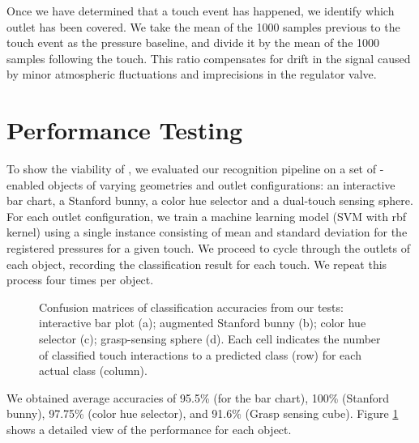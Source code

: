 			Once we have determined that a touch event has happened, we identify which
			outlet has been covered. We take the mean of the 1000 samples previous to
			the touch event as the pressure baseline, and divide it by the mean of the
			1000 samples following the touch. This ratio compensates for drift in the
			signal caused by minor atmospheric fluctuations and imprecisions in the
			regulator valve.

    \section{Performance Testing}
			To show the viability of \at, we evaluated our recognition pipeline on a
			set of \at-enabled objects of varying geometries and outlet
			configurations: an interactive bar chart, a Stanford bunny, a color hue
			selector and a dual-touch sensing sphere.  For each outlet configuration,
			we train a machine learning model (SVM with rbf kernel) using a single
			instance consisting of mean and standard deviation for the registered
			pressures for a given touch. We proceed to cycle through the outlets of
			each object, recording the classification result for each touch. We repeat
			this process four times per object.
        
			\begin{figure}[h]
				\centering
				 \hfill

				\caption{Confusion matrices of classification accuracies from our tests:
					interactive bar plot (a); augmented Stanford bunny (b); color hue
					selector (c); grasp-sensing sphere (d). Each cell indicates the number
					of classified touch interactions to a predicted class (row) for each
					actual class (column).}
				\label{fig:confusion-matrices}%
			\end{figure}

			We obtained average accuracies of 95.5\% (for the bar chart), 100\%
			(Stanford bunny), 97.75\% (color hue selector), and 91.6\% (Grasp sensing
			cube). Figure \ref{fig:confusion-matrices} shows a detailed view of the
			performance for each object.

